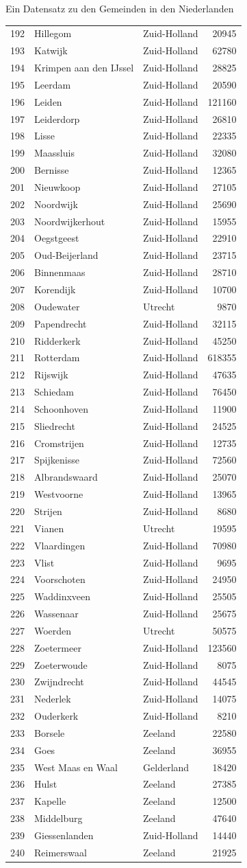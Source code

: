 \documentclass[ignorenonframetext,]{beamer}
\begin{document}
\begin{frame}[fragile]{Ein Datensatz zu den Gemeinden in den
Niederlanden}
\begin{longtable}[]{@{}lllr@{}}
192 & Hillegom & Zuid-Holland & 20945\tabularnewline
193 & Katwijk & Zuid-Holland & 62780\tabularnewline
194 & Krimpen aan den IJssel & Zuid-Holland & 28825\tabularnewline
195 & Leerdam & Zuid-Holland & 20590\tabularnewline
196 & Leiden & Zuid-Holland & 121160\tabularnewline
197 & Leiderdorp & Zuid-Holland & 26810\tabularnewline
198 & Lisse & Zuid-Holland & 22335\tabularnewline
199 & Maassluis & Zuid-Holland & 32080\tabularnewline
200 & Bernisse & Zuid-Holland & 12365\tabularnewline
201 & Nieuwkoop & Zuid-Holland & 27105\tabularnewline
202 & Noordwijk & Zuid-Holland & 25690\tabularnewline
203 & Noordwijkerhout & Zuid-Holland & 15955\tabularnewline
204 & Oegstgeest & Zuid-Holland & 22910\tabularnewline
205 & Oud-Beijerland & Zuid-Holland & 23715\tabularnewline
206 & Binnenmaas & Zuid-Holland & 28710\tabularnewline
207 & Korendijk & Zuid-Holland & 10700\tabularnewline
208 & Oudewater & Utrecht & 9870\tabularnewline
209 & Papendrecht & Zuid-Holland & 32115\tabularnewline
210 & Ridderkerk & Zuid-Holland & 45250\tabularnewline
211 & Rotterdam & Zuid-Holland & 618355\tabularnewline
212 & Rijswijk & Zuid-Holland & 47635\tabularnewline
213 & Schiedam & Zuid-Holland & 76450\tabularnewline
214 & Schoonhoven & Zuid-Holland & 11900\tabularnewline
215 & Sliedrecht & Zuid-Holland & 24525\tabularnewline
216 & Cromstrijen & Zuid-Holland & 12735\tabularnewline
217 & Spijkenisse & Zuid-Holland & 72560\tabularnewline
218 & Albrandswaard & Zuid-Holland & 25070\tabularnewline
219 & Westvoorne & Zuid-Holland & 13965\tabularnewline
220 & Strijen & Zuid-Holland & 8680\tabularnewline
221 & Vianen & Utrecht & 19595\tabularnewline
222 & Vlaardingen & Zuid-Holland & 70980\tabularnewline
223 & Vlist & Zuid-Holland & 9695\tabularnewline
224 & Voorschoten & Zuid-Holland & 24950\tabularnewline
225 & Waddinxveen & Zuid-Holland & 25505\tabularnewline
226 & Wassenaar & Zuid-Holland & 25675\tabularnewline
227 & Woerden & Utrecht & 50575\tabularnewline
228 & Zoetermeer & Zuid-Holland & 123560\tabularnewline
229 & Zoeterwoude & Zuid-Holland & 8075\tabularnewline
230 & Zwijndrecht & Zuid-Holland & 44545\tabularnewline
231 & Nederlek & Zuid-Holland & 14075\tabularnewline
232 & Ouderkerk & Zuid-Holland & 8210\tabularnewline
233 & Borsele & Zeeland & 22580\tabularnewline
234 & Goes & Zeeland & 36955\tabularnewline
235 & West Maas en Waal & Gelderland & 18420\tabularnewline
236 & Hulst & Zeeland & 27385\tabularnewline
237 & Kapelle & Zeeland & 12500\tabularnewline
238 & Middelburg & Zeeland & 47640\tabularnewline
239 & Giessenlanden & Zuid-Holland & 14440\tabularnewline
240 & Reimerswaal & Zeeland & 21925\tabularnewline

\end{longtable}
\end{frame}
\end{document}
